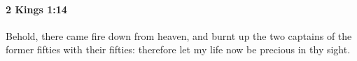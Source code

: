 
		\paragraph{2 Kings 1:14} %
			\label{2KINGS-1-14}

			Behold, there came fire down from heaven, and burnt up the two captains of the former fifties with their fifties: therefore let my life now be precious in thy sight.


